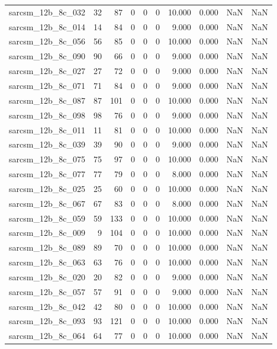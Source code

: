 \documentclass{article}
\begin{document}
\begin{longtable}{lrrrrrrrrr}
sarcsm\_12b\_8c\_032 & 32 & 87 & 0 & 0 & 0 & 10.000 & 0.000 & NaN & NaN \\
sarcsm\_12b\_8c\_014 & 14 & 84 & 0 & 0 & 0 & 9.000 & 0.000 & NaN & NaN \\
sarcsm\_12b\_8c\_056 & 56 & 85 & 0 & 0 & 0 & 10.000 & 0.000 & NaN & NaN \\
sarcsm\_12b\_8c\_090 & 90 & 66 & 0 & 0 & 0 & 9.000 & 0.000 & NaN & NaN \\
sarcsm\_12b\_8c\_027 & 27 & 72 & 0 & 0 & 0 & 9.000 & 0.000 & NaN & NaN \\
sarcsm\_12b\_8c\_071 & 71 & 84 & 0 & 0 & 0 & 9.000 & 0.000 & NaN & NaN \\
sarcsm\_12b\_8c\_087 & 87 & 101 & 0 & 0 & 0 & 10.000 & 0.000 & NaN & NaN \\
sarcsm\_12b\_8c\_098 & 98 & 76 & 0 & 0 & 0 & 9.000 & 0.000 & NaN & NaN \\
sarcsm\_12b\_8c\_011 & 11 & 81 & 0 & 0 & 0 & 10.000 & 0.000 & NaN & NaN \\
sarcsm\_12b\_8c\_039 & 39 & 90 & 0 & 0 & 0 & 9.000 & 0.000 & NaN & NaN \\
sarcsm\_12b\_8c\_075 & 75 & 97 & 0 & 0 & 0 & 10.000 & 0.000 & NaN & NaN \\
sarcsm\_12b\_8c\_077 & 77 & 79 & 0 & 0 & 0 & 8.000 & 0.000 & NaN & NaN \\
sarcsm\_12b\_8c\_025 & 25 & 60 & 0 & 0 & 0 & 10.000 & 0.000 & NaN & NaN \\
sarcsm\_12b\_8c\_067 & 67 & 83 & 0 & 0 & 0 & 8.000 & 0.000 & NaN & NaN \\
sarcsm\_12b\_8c\_059 & 59 & 133 & 0 & 0 & 0 & 10.000 & 0.000 & NaN & NaN \\
sarcsm\_12b\_8c\_009 & 9 & 104 & 0 & 0 & 0 & 10.000 & 0.000 & NaN & NaN \\
sarcsm\_12b\_8c\_089 & 89 & 70 & 0 & 0 & 0 & 10.000 & 0.000 & NaN & NaN \\
sarcsm\_12b\_8c\_063 & 63 & 76 & 0 & 0 & 0 & 10.000 & 0.000 & NaN & NaN \\
sarcsm\_12b\_8c\_020 & 20 & 82 & 0 & 0 & 0 & 9.000 & 0.000 & NaN & NaN \\
sarcsm\_12b\_8c\_057 & 57 & 91 & 0 & 0 & 0 & 9.000 & 0.000 & NaN & NaN \\
sarcsm\_12b\_8c\_042 & 42 & 80 & 0 & 0 & 0 & 10.000 & 0.000 & NaN & NaN \\
sarcsm\_12b\_8c\_093 & 93 & 121 & 0 & 0 & 0 & 10.000 & 0.000 & NaN & NaN \\
sarcsm\_12b\_8c\_064 & 64 & 77 & 0 & 0 & 0 & 10.000 & 0.000 & NaN & NaN \\

\end{longtable}
\end{document}
